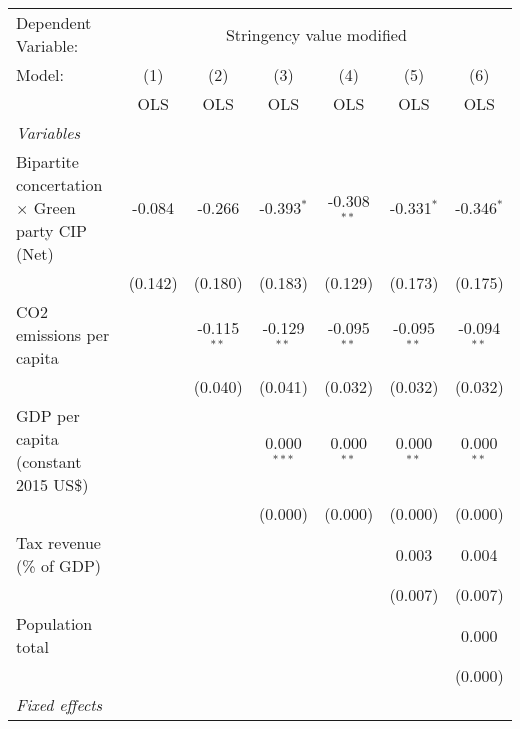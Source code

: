 
\begingroup
\centering
\begin{tabular}{lcccccc}
   \toprule
   Dependent Variable: & \multicolumn{6}{c}{Stringency value modified}\\
   Model:                                                 & (1)     & (2)           & (3)           & (4)           & (5)           & (6)\\  
                                                          &  OLS    & OLS           & OLS           & OLS           & OLS           & OLS\\  
   \midrule
   \emph{Variables}\\
   Bipartite concertation $\times$ Green party CIP (Net)  & -0.084  & -0.266        & -0.393$^{*}$  & -0.308$^{**}$ & -0.331$^{*}$  & -0.346$^{*}$\\   
                                                          & (0.142) & (0.180)       & (0.183)       & (0.129)       & (0.173)       & (0.175)\\   
   CO2 emissions per capita                               &         & -0.115$^{**}$ & -0.129$^{**}$ & -0.095$^{**}$ & -0.095$^{**}$ & -0.094$^{**}$\\   
                                                          &         & (0.040)       & (0.041)       & (0.032)       & (0.032)       & (0.032)\\   
   GDP per capita (constant 2015 US\$)                    &         &               & 0.000$^{***}$ & 0.000$^{**}$  & 0.000$^{**}$  & 0.000$^{**}$\\   
                                                          &         &               & (0.000)       & (0.000)       & (0.000)       & (0.000)\\   
   Tax revenue (\% of GDP)                                &         &               &               &               & 0.003         & 0.004\\   
                                                          &         &               &               &               & (0.007)       & (0.007)\\   
   Population total                                       &         &               &               &               &               & 0.000\\   
                                                          &         &               &               &               &               & (0.000)\\   
   \emph{Fixed effects}\\

\end{tabular}
